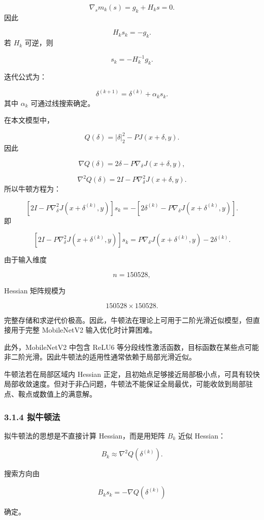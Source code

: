 ﻿\documentclass[UTF8,zihao=-4,fontset=none]{ctexart}
\begin{document}
\[
\nabla_s m_k(s)=g_k+H_ks=0.
\]
\noindent 因此

\[
H_ks_k=-g_k.
\]
\noindent 若 \(H_k\) 可逆，则

\[
s_k=-H_k^{-1}g_k.
\]

迭代公式为：

\[
\delta^{(k+1)}
=
\delta^{(k)}+\alpha_ks_k.
\]
\noindent 其中 \(\alpha_k\) 可通过线搜索确定。

在本文模型中，

\[
Q(\delta)=|\delta|_2^2-PJ(x+\delta,y).
\]
\noindent 因此

\[
\nabla Q(\delta)=2\delta-P\nabla_\delta J(x+\delta,y),
\]

\[
\nabla^2Q(\delta)=2I-P\nabla_\delta^2J(x+\delta,y).
\]
\noindent 所以牛顿方程为：

\[
\left[
2I-P\nabla_\delta^2J(x+\delta^{(k)},y)
\right]s_k
=
-\left[
2\delta^{(k)}-P\nabla_\delta J(x+\delta^{(k)},y)
\right].
\]
\noindent 即

\[
\left[
2I-P\nabla_\delta^2J(x+\delta^{(k)},y)
\right]s_k
=
P\nabla_\delta J(x+\delta^{(k)},y)
-
2\delta^{(k)}.
\]

由于输入维度

\[
n=150528,
\]

Hessian 矩阵规模为

\[
150528\times150528.
\]

完整存储和求逆代价极高。因此，牛顿法在理论上可用于二阶光滑近似模型，但直接用于完整 MobileNetV2 输入优化时计算困难。

此外，MobileNetV2 中包含 ReLU6 等分段线性激活函数，目标函数在某些点可能非二阶光滑。因此牛顿法的适用性通常依赖于局部光滑近似。

牛顿法若在局部区域内 Hessian 正定，且初始点足够接近局部极小点，可具有较快局部收敛速度。但对于非凸问题，牛顿法不能保证全局最优，可能收敛到局部驻点、鞍点或数值上的满意解。

\subsubsection*{3.1.4 拟牛顿法}
{}

拟牛顿法的思想是不直接计算 Hessian，而是用矩阵 \(B_k\) 近似 Hessian：

\[
B_k\approx \nabla^2Q(\delta^{(k)}).
\]

搜索方向由

\[
B_ks_k=-\nabla Q(\delta^{(k)})
\]

确定。
\end{document}
